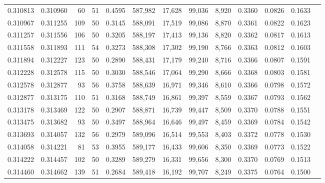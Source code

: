 \begin{tabular}{rrrrrrrrrrrrr}
0.310813 & 0.310960 &    60 &  51 &                                     0.4595 & 587,982 &  17,628 &  99,036 &   8,920 & 0.3360 & 0.0826 & 0.1633 \\
0.310967 & 0.311255 &   109 &  50 &                                     0.3145 & 588,091 &  17,519 &  99,086 &   8,870 & 0.3361 & 0.0822 & 0.1623 \\
0.311257 & 0.311556 &   106 &  50 &                                     0.3205 & 588,197 &  17,413 &  99,136 &   8,820 & 0.3362 & 0.0817 & 0.1613 \\
0.311558 & 0.311893 &   111 &  54 &                                     0.3273 & 588,308 &  17,302 &  99,190 &   8,766 & 0.3363 & 0.0812 & 0.1603 \\
0.311894 & 0.312227 &   123 &  50 &                                     0.2890 & 588,431 &  17,179 &  99,240 &   8,716 & 0.3366 & 0.0807 & 0.1591 \\
0.312228 & 0.312578 &   115 &  50 &                                     0.3030 & 588,546 &  17,064 &  99,290 &   8,666 & 0.3368 & 0.0803 & 0.1581 \\
0.312578 & 0.312877 &    93 &  56 &                                     0.3758 & 588,639 &  16,971 &  99,346 &   8,610 & 0.3366 & 0.0798 & 0.1572 \\
0.312877 & 0.313175 &   110 &  51 &                                     0.3168 & 588,749 &  16,861 &  99,397 &   8,559 & 0.3367 & 0.0793 & 0.1562 \\
0.313178 & 0.313469 &   122 &  50 &                                     0.2907 & 588,871 &  16,739 &  99,447 &   8,509 & 0.3370 & 0.0788 & 0.1551 \\
0.313475 & 0.313682 &    93 &  50 &                                     0.3497 & 588,964 &  16,646 &  99,497 &   8,459 & 0.3369 & 0.0784 & 0.1542 \\
0.313693 & 0.314057 &   132 &  56 &                                     0.2979 & 589,096 &  16,514 &  99,553 &   8,403 & 0.3372 & 0.0778 & 0.1530 \\
0.314058 & 0.314221 &    81 &  53 &                                     0.3955 & 589,177 &  16,433 &  99,606 &   8,350 & 0.3369 & 0.0773 & 0.1522 \\
0.314222 & 0.314457 &   102 &  50 &                                     0.3289 & 589,279 &  16,331 &  99,656 &   8,300 & 0.3370 & 0.0769 & 0.1513 \\
0.314460 & 0.314662 &   139 &  51 &                                     0.2684 & 589,418 &  16,192 &  99,707 &   8,249 & 0.3375 & 0.0764 & 0.1500 \\

\end{tabular}
